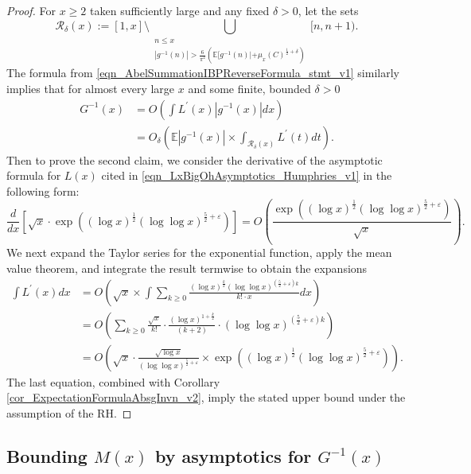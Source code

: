 \documentclass[11pt,reqno,a4letter]{article}
\numberwithin{figure}{section}
\numberwithin{table}{section}
\theoremstyle{plain}
\numberwithin{theorem}{section}
\theoremstyle{definition}
\begin{document}
\begin{proof}
For $x \geq 2$ taken sufficiently large and any fixed $\delta > 0$, let the sets 
\[
\mathcal{R}_{\delta}(x) := [1, x] \setminus \bigcup_{\substack{n \leq x \\ 
     |g^{-1}(n)| > \frac{6}{\pi^2}\left( 
     \mathbb{E}[g^{-1}(n)| + \mu_x(C)^{\frac{1}{2}+\delta}\right)}} [n, n+1). 
\]
The formula from \eqref{eqn_AbelSummationIBPReverseFormula_stmt_v1} similarly implies 
that for almost every large $x$ and some finite, bounded $\delta > 0$ 
\begin{align*}
G^{-1}(x) & = O\left(\int L^{\prime}(x) |g^{-1}(x)| dx\right) \\ 
     & = O_{\delta}\left(\mathbb{E}|g^{-1}(x)| \times \int_{\mathcal{R}_{\delta}(x)} 
     L^{\prime}(t) dt\right). 
\end{align*} 
Then to prove the second claim, we consider the derivative of the 
asymptotic formula for $L(x)$ cited in 
\eqref{eqn_LxBigOhAsymptotics_Humphries_v1} in the following form: 
\[
\frac{d}{dx}\left[\sqrt{x} \cdot \exp\left( (\log x)^{\frac{1}{2}} 
     (\log\log x)^{\frac{5}{2} + \varepsilon}\right)\right] = 
     O\left(\frac{\exp\left( (\log x)^{\frac{1}{2}} 
     (\log\log x)^{\frac{5}{2} + \varepsilon}\right)}{\sqrt{x}} 
     \right).
\]
We next expand the Taylor series for the exponential function, apply the 
mean value theorem, and integrate the result termwise to obtain the 
expansions 
\begin{align*} 
\int L^{\prime}(x) dx & = O\left(\sqrt{x} \times \int \sum_{k \geq 0} 
     \frac{(\log x)^{\frac{k}{2}} (\log\log x)^{\left(\frac{5}{2} + \varepsilon\right)k}}{k! \cdot x} dx 
     \right) \\ 
     & = O\left(\sum_{k \geq 0} \frac{\sqrt{x}}{k!} \cdot 
     \frac{(\log x)^{1+\frac{k}{2}}}{(k+2)} \cdot 
     (\log\log x)^{\left(\frac{5}{2}+\varepsilon\right)k}\right) \\ 
     & = O\left(\sqrt{x} \cdot \frac{\sqrt{\log x}}{(\log\log x)^{\frac{5}{2}+\varepsilon}} \times 
     \exp\left( (\log x)^{\frac{1}{2}} 
     (\log\log x)^{\frac{5}{2} + \varepsilon}\right)
     \right). 
\end{align*} 
The last equation, combined with 
Corollary \ref{cor_ExpectationFormulaAbsgInvn_v2}, 
imply the stated upper bound under the assumption of the RH. 
\end{proof} 

\subsection{Bounding $M(x)$ by asymptotics for $G^{-1}(x)$} 
\end{document}
